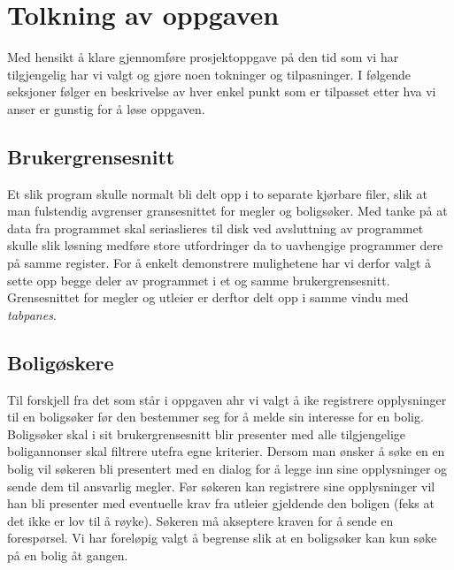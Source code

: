 \section{Tolkning av oppgaven}
Med hensikt å klare gjennomføre prosjektoppgave på den tid som vi har tilgjengelig har vi valgt og gjøre noen tokninger og tilpasninger. I følgende seksjoner følger en beskrivelse av hver enkel punkt som er tilpasset etter hva vi anser er gunstig for å løse oppgaven.
\subsection{Brukergrensesnitt}
Et slik program skulle normalt bli delt opp i to separate kjørbare filer, slik at man fulstendig avgrenser gransesnittet for megler og boligsøker. Med tanke på at data fra programmet skal seriaslieres til disk ved avsluttning av programmet skulle slik løsning medføre store utfordringer da to uavhengige programmer dere på samme register. For å enkelt demonstrere mulighetene har vi derfor valgt å sette opp begge deler av programmet i et og samme brukergrensesnitt. Grensesnittet for megler og utleier er derftor delt opp i samme vindu med \emph{tabpanes}. 

\subsection{Boligøskere} \label{sec:sokere}
Til forskjell fra det som står i oppgaven ahr vi valgt å ike registrere opplysninger til en boligsøker før den bestemmer seg for å melde sin interesse for en bolig. Boligsøker skal i sit brukergrensesnitt blir presenter med alle tilgjengelige boligannonser skal filtrere utefra egne kriterier. Dersom man ønsker å søke en en bolig vil søkeren bli presentert med en dialog for å legge inn sine opplysninger og sende dem til ansvarlig megler. Før søkeren kan registrere sine opplysninger vil han bli presenter med eventuelle krav fra utleier gjeldende den boligen (feks at det ikke er lov til å røyke). Søkeren må akseptere kraven for å sende en forespørsel. Vi har foreløpig valgt å begrense slik at en boligsøker kan kun søke på en bolig åt gangen. 

